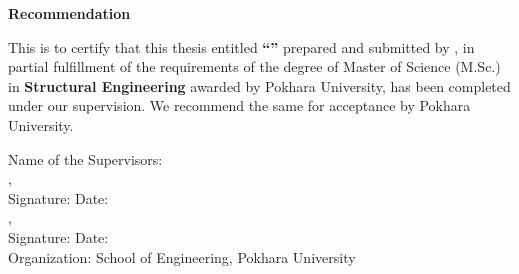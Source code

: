 \begin{titlepage}
    
    \vspace*{28pt} 
    \vspace{10pt} %

    \begin{center}
        {\fontsize{16}{20}\selectfont \textbf{Recommendation}}
    \end{center}
    
    \vspace{14pt} 
    \vspace{10pt} %

    {\fontsize{12}{18}\selectfont
    \noindent
    This is to certify that this thesis entitled \textbf{``\myThesisTitle''} prepared and submitted by \textbf{\myStudentName}, in partial fulfillment of the requirements of the degree of Master of Science (M.Sc.) in \textbf{Structural Engineering} awarded by Pokhara University, has been completed under our supervision. We recommend the same for acceptance by Pokhara University.
    }

    \vspace*{42pt}
    \vspace{10pt} %

    \begin{flushleft}
        {\fontsize{12}{18}\selectfont
        Name of the Supervisors: \\[8pt]
        \mySupervisorOneName, \mySupervisorOneDesignation \\[8pt]
        Signature: \underline{\hspace{5cm}} \hspace{0.5cm} Date: \underline{\hspace{3cm}} \\[16pt]
        \mySupervisorTwoName, \mySupervisorTwoDesignation \\[8pt]
        Signature: \underline{\hspace{5cm}} \hspace{0.5cm} Date: \underline{\hspace{3cm}} \\[12pt]
        Organization: School of Engineering, Pokhara University
        }
    \end{flushleft}

\end{titlepage}